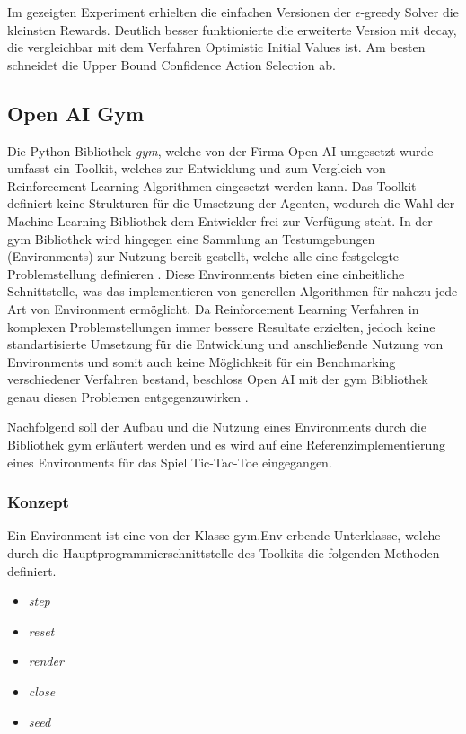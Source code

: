 \documentclass[11pt]{scrartcl}
\begin{document}
\noindent
Im gezeigten Experiment erhielten die einfachen Versionen der $\epsilon$-greedy Solver die
kleinsten Rewards. Deutlich besser funktionierte die erweiterte Version mit decay, die
vergleichbar mit dem Verfahren Optimistic Initial Values ist. Am besten schneidet die
Upper Bound Confidence Action Selection ab.


\newpage
\subsection{Open AI Gym}
Die Python Bibliothek \textit{gym}, welche von der Firma Open AI umgesetzt wurde umfasst ein
Toolkit, welches zur Entwicklung und zum Vergleich von Reinforcement Learning Algorithmen
eingesetzt werden kann. Das Toolkit definiert keine Strukturen für die Umsetzung der Agenten,
wodurch die Wahl der Machine Learning Bibliothek dem Entwickler frei zur Verfügung steht. In
der gym Bibliothek wird hingegen eine Sammlung an Testumgebungen (Environments) zur Nutzung
bereit gestellt, welche alle eine festgelegte Problemstellung definieren \cite{OAI2016}. 
Diese Environments bieten eine einheitliche Schnittstelle, was das implementieren von
generellen Algorithmen für nahezu jede Art von Environment ermöglicht. Da Reinforcement
Learning Verfahren in komplexen Problemstellungen immer bessere Resultate erzielten, jedoch
keine standartisierte Umsetzung für die Entwicklung und anschließende Nutzung von Environments
und somit auch keine Möglichkeit für ein Benchmarking verschiedener Verfahren bestand,
beschloss Open AI mit der gym Bibliothek genau diesen Problemen entgegenzuwirken
\cite{OAI2016}.

Nachfolgend soll der Aufbau und die Nutzung eines Environments durch die Bibliothek gym
erläutert werden und es wird auf eine Referenzimplementierung eines Environments für das
Spiel Tic-Tac-Toe eingegangen.


\subsubsection{Konzept}
Ein Environment ist eine von der Klasse gym.Env erbende Unterklasse, welche durch die
Hauptprogrammierschnittstelle des Toolkits die folgenden Methoden definiert.

\begin{itemize}
\itemsep-6pt
\item \textit{step}
\item \textit{reset}
\item \textit{render}
\item \textit{close}
\item \textit{seed}
\end{itemize}  
\end{document}

